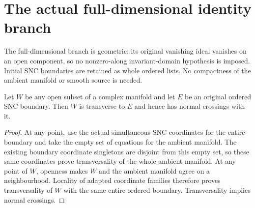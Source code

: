 \section{The actual full-dimensional identity branch}

The full-dimensional branch is geometric: its original vanishing ideal
vanishes on an open component, so no nonzero-along invariant-domain
hypothesis is imposed. Initial SNC boundaries are retained as whole
ordered lists. No compactness of the ambient manifold or smooth source
is needed.

\begin{lemma}
\label{hir:original-open-carrier-snc-transverse}
\leanok
Let $W$ be any open subset of a complex manifold and let $E$ be an
original ordered SNC boundary. Then $W$ is transverse to $E$ and hence
has normal crossings with it.
\end{lemma}
\begin{proof}
At any point, use the actual simultaneous SNC coordinates for the
entire boundary and take the empty set of equations for the ambient
manifold. The existing boundary coordinate singletons are disjoint
from this empty set, so these same coordinates prove transversality
of the whole ambient manifold. At any point of $W$, openness makes
$W$ and the ambient manifold agree on a neighbourhood. Locality of
adapted coordinate families therefore proves transversality of $W$
with the same entire ordered boundary. Transversality implies normal
crossings.
\end{proof}

